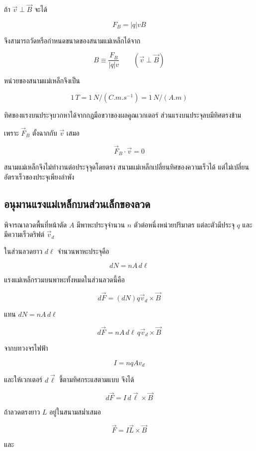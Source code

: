 ถ้า $\vec{v}\perp\vec{B}$ จะได้

\[
F_B=|q|vB
\]

จึงสามารถวัดหรือกำหนดขนาดของสนามแม่เหล็กได้จาก

\[
\boxed{B\equiv\frac{F_B}{|q|v}}
\qquad
(\vec{v}\perp\vec{B})
\]

หน่วยของสนามแม่เหล็กจึงเป็น

\[
1\,\si{T}
=
1\,\si{N/(C.m.s^{-1})}
=
1\,\si{N/(A.m)}
\]

ทิศของแรงบนประจุบวกหาได้จากกฎมือขวาของผลคูณเวกเตอร์ ส่วนแรงบนประจุลบมีทิศตรงข้าม

\begin{tcolorbox}[title={ผลสำคัญ}]
เพราะ $\vec{F}_B$ ตั้งฉากกับ $\vec{v}$ เสมอ

\[
\vec{F}_B\cdot\vec{v}=0
\]

สนามแม่เหล็กจึงไม่ทำงานต่อประจุจุดโดยตรง สนามแม่เหล็กเปลี่ยนทิศของความเร็วได้ แต่ไม่เปลี่ยนอัตราเร็วของประจุเพียงลำพัง
\end{tcolorbox}

\subsection{อนุมานแรงแม่เหล็กบนส่วนเล็กของลวด}

พิจารณาลวดพื้นที่หน้าตัด $A$ มีพาหะประจุจำนวน $n$ ตัวต่อหนึ่งหน่วยปริมาตร แต่ละตัวมีประจุ $q$ และมีความเร็วดริฟต์ $\vec{v}_d$

ในส่วนลวดยาว $d\ell$ จำนวนพาหะประจุคือ

\[
dN=nA\,d\ell
\]

แรงแม่เหล็กรวมบนพาหะทั้งหมดในส่วนลวดนี้คือ

\[
d\vec{F}
=
(dN)q\vec{v}_d\times\vec{B}
\]

แทน $dN=nA\,d\ell$

\[
d\vec{F}
=
nA\,d\ell\,q\vec{v}_d\times\vec{B}
\]

จากบทวงจรไฟฟ้า

\[
I=nqAv_d
\]

และให้เวกเตอร์ $d\vec{\ell}$ ชี้ตามทิศกระแสตามแบบ จึงได้

\begin{tcolorbox}[title={แรงแม่เหล็กบนส่วนกระแส ซึ่งอนุมานจากแรงบนประจุ}]
\[
\boxed{d\vec{F}=I\,d\vec{\ell}\times\vec{B}}
\]
\end{tcolorbox}

ถ้าลวดตรงยาว $L$ อยู่ในสนามสม่ำเสมอ

\[
\boxed{\vec{F}=I\vec{L}\times\vec{B}}
\]

และ

